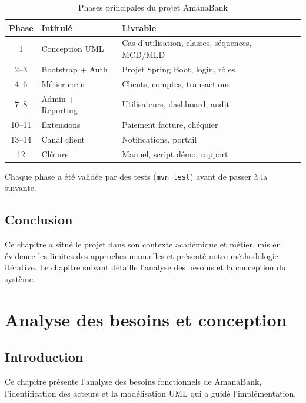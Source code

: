 \documentclass[11pt,a4paper,oneside]{report}
\newcommand{\nomapplication}{AmanaBank}
\begin{document}
\begin{table}[H]
    \centering
    \caption{Phases principales du projet \nomapplication}
    \label{tab:phases}
    \small
    \begin{tabular}{@{}clp{7cm}@{}}
        \rowcolor{AmanaBrown}
        \color{white}\textbf{Phase} & \textbf{Intitulé} & \textbf{Livrable} \\
        \midrule
        1 & Conception UML & Cas d'utilisation, classes, séquences, MCD/MLD \\
        2--3 & Bootstrap + Auth & Projet Spring Boot, login, rôles \\
        4--6 & Métier cœur & Clients, comptes, transactions \\
        7--8 & Admin + Reporting & Utilisateurs, dashboard, audit \\
        10--11 & Extensions & Paiement facture, chéquier \\
        13--14 & Canal client & Notifications, portail \\
        12 & Clôture & Manuel, script démo, rapport \\
        \bottomrule
    \end{tabular}
\end{table}

Chaque phase a été validée par des tests (\texttt{mvn test}) avant de passer à la suivante.

\section{Conclusion}

Ce chapitre a situé le projet dans son contexte académique et métier, mis en évidence les limites des approches manuelles et présenté notre méthodologie itérative. Le chapitre suivant détaille l'analyse des besoins et la conception du système.

\chapter{Analyse des besoins et conception}
\label{ch:conception}

\section{Introduction}

Ce chapitre présente l'analyse des besoins fonctionnels de \nomapplication, l'identification des acteurs et la modélisation UML qui a guidé l'implémentation.
\end{document}
